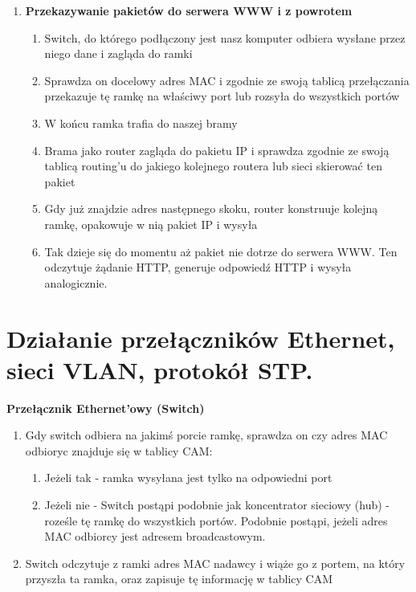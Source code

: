 \documentclass[main.tex]{subfiles}
\begin{document}
\begin{enumerate}
        \item \textbf{Przekazywanie pakietów do serwera WWW i z powrotem}
        \begin{enumerate}[noitemsep]
            \item Switch, do którego podłączony jest nasz komputer odbiera wysłane przez niego dane i zagląda do ramki
            \item Sprawdza on docelowy adres MAC i zgodnie ze swoją tablicą przełączania przekazuje tę ramkę na właściwy port
            lub rozsyła do wszystkich portów
            \item W końcu ramka trafia do naszej bramy
            \item Brama jako router zagląda do pakietu IP i sprawdza zgodnie ze swoją tablicą routing'u do jakiego
            kolejnego routera lub sieci skierować ten pakiet
            \item Gdy już znajdzie adres następnego skoku, router konstruuje kolejną ramkę, opakowuje w nią pakiet IP
            i wysyła
            \item Tak dzieje się do momentu aż pakiet nie dotrze do serwera WWW. Ten odczytuje żądanie HTTP, generuje
            odpowiedź HTTP i wysyła analogicznie.
        \end{enumerate}
    \end{enumerate}


    \section{Działanie przełączników Ethernet, sieci VLAN, protokół STP.}
    \textbf{Przełącznik Ethernet'owy (Switch)}
    \begin{enumerate}[noitemsep]
        \item Gdy switch odbiera na jakimś porcie ramkę, sprawdza on czy adres MAC odbioryc znajduje się w tablicy CAM:
        \begin{enumerate}[noitemsep]
            \item Jeżeli tak - ramka wysyłana jest tylko na odpowiedni port
            \item Jeżeli nie - Switch postąpi podobnie jak koncentrator sieciowy (hub) - roześle tę ramkę do wszystkich
            portów. Podobnie postąpi, jeżeli adres MAC odbiorcy jest adresem broadcastowym.
        \end{enumerate}
        \item Switch odczytuje z ramki adres MAC nadawcy i wiąże go z portem, na który przyszła ta ramka, oraz zapisuje tę informację w tablicy CAM
    \end{enumerate}
\end{document}
